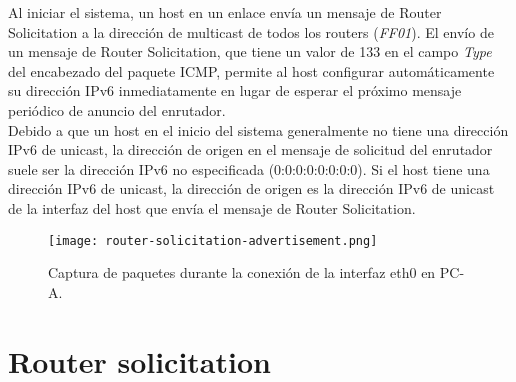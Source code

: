 \documentclass[osajnl,twocolumn,showpacs,superscriptaddress,10pt]{revtex4-1} %
\begin{document}
Al iniciar el sistema, un host en un enlace envía un mensaje de Router Solicitation a la dirección de multicast de todos 
los routers (\textit{FF01}). El envío de un mensaje de Router Solicitation, que tiene un valor de 133 en el 
campo \textit{Type} del encabezado del paquete ICMP, permite al host configurar automáticamente su dirección IPv6 
inmediatamente en lugar de esperar el próximo mensaje periódico de anuncio del enrutador. \\

Debido a que un host en el inicio del sistema generalmente no tiene una dirección IPv6 de unicast, la dirección de origen 
en el mensaje de solicitud del enrutador suele ser la dirección IPv6 no especificada (0:0:0:0:0:0:0:0). 
Si el host tiene una dirección IPv6 de unicast, la dirección de origen es la dirección IPv6 de unicast 
de la interfaz del host que envía el mensaje de Router Solicitation. \\

\begin{figure}[H]
    \centering
    \texttt{[image: router-solicitation-advertisement.png]}
    \caption{Captura de paquetes durante la conexión de la interfaz eth0 en PC-A.}
    \label{image:router-solicitation-advertisement}
\end{figure}

\section{Router solicitation} 
\end{document}
